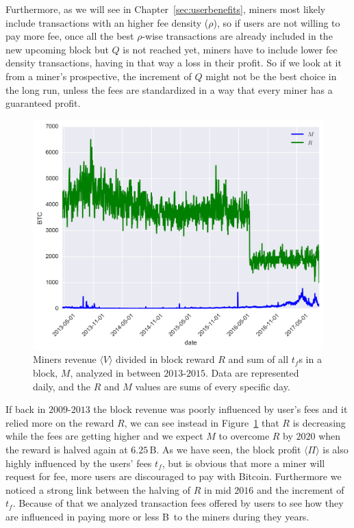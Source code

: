 \documentclass[USenglish]{uit-thesis}
\def\bitcoin{\leavevmode\rlap{\hskip.5pt-}B}
\begin{document}
Furthermore, as we will see in
Chapter~\ref{sec:userbenefits}, miners most likely
include transactions with an higher fee density ($\rho$),
so if users are not willing to pay more fee,
once all the best $\rho$-wise
transactions are already included in the new upcoming block
but $Q$ is not reached yet, miners
have to include lower fee density
transactions, having in that way a loss in their profit.
So if we look at it from a miner's prospective, the increment
of $Q$ might not be the best choice in the long run, unless the
fees are standardized in a way that every
miner has a guaranteed profit.
\begin{figure}[h]
	\centering
	\includegraphics[width=1\textwidth]{img/reward_fee}
	\caption{Miners revenue $\langle V \rangle$ divided in block reward $R$ and sum
		of all $t_f$s in a block, $M$, analyzed in between $2013$-$2015$. Data are
	represented daily, and the $R$ and $M$ values are sums of every specific day.}
	\label{fig:reward_fee}
\end{figure}
If back in $2009$-$2013$ the block revenue was
poorly influenced by user's fees and it relied more
on the reward $R$, we can see instead
in Figure~\ref{fig:reward_fee} that $R$ is decreasing
while the fees are getting higher and we expect 
$M$ to overcome $R$ by $2020$ when the
reward is halved again at $6.25$\,\bitcoin.
As we have seen, the block profit $\langle \Pi \rangle$
is also highly influenced by the
users' fees $t_f$,
but is obvious that more a miner will
request for fee,
more users are discouraged to pay with Bitcoin.
Furthermore we noticed a strong link between
the halving of $R$ in mid $2016$ and the increment of $t_f$.
Because of that we analyzed transaction fees
offered by users to see how they are influenced
in paying more or less \bitcoin~to the miners during
they years.
\end{document}
